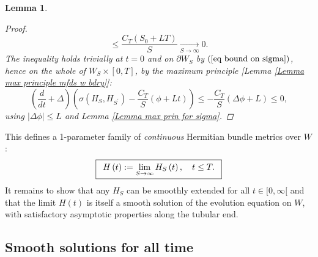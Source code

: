 \documentclass{article}
\newtheorem{lemma}[theorem]{Lemma}
\begin{document}
\begin{lemma}
\begin{proof}
\begin{equation*}
        \leq \frac{C_{T}\left( S_{0}+LT\right) }{S}
        \underset{S\rightarrow \infty }{\longrightarrow }0.
\end{equation*}%
The inequality holds trivially at $t=0$ and on $\partial W_{S}$ by $\left( \ref{eq bound on sigma}\right) $, hence on the whole of $W_{S}\times \left[ 0,T%
\right] $, by the maximum principle [\emph{Lemma \ref{Lemma max principle
mfds w bdry}}]:%
\begin{equation*}
\left( \frac{d}{dt}+\Delta \right) \left( \sigma \left( H_{S},H_{S^{\prime
}}\right) -\frac{C_{T}}{S}\left( \phi +Lt\right) \right) \leq -\frac{C_{T}}{S%
}\left( \Delta \phi +L\right) \leq 0,
\end{equation*}%
using $\left\vert \Delta \phi \right\vert \leq L$ and \emph{Lemma \ref{Lemma
max prin for sigma}}.
\end{proof}
\end{lemma}

 
This defines a 1-parameter family of \emph{continuous} Hermitian bundle metrics over  $W$:%
\begin{equation}        \label{Eq limit metric H(t)}
\fbox{$%
\begin{array}{c}
        H\left( t\right) := \lim\limits_{S\rightarrow \infty }
        H_{S}\left(t\right) ,\quad t\leq T. 
\end{array}%
$}  
\end{equation}%
It remains to show that any $H_{S}$ can be smoothly extended for all $t\in \lbrack 0,\infty \lbrack $ and that the limit $H\left( t\right) $ is itself a smooth solution of the evolution equation on $W$, with satisfactory asymptotic properties along the tubular end.

\subsection{Smooth solutions for all time}
\label{subsec smooth sols for all time}
\end{document}
